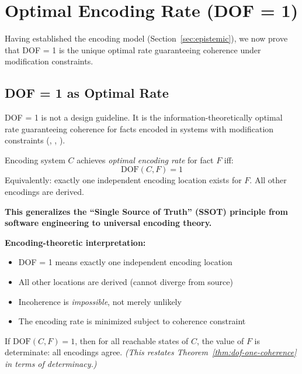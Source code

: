 \section{Optimal Encoding Rate (DOF = 1)}\label{sec:ssot}

Having established the encoding model (Section~\ref{sec:epistemic}), we now prove that DOF = 1 is the unique optimal rate guaranteeing coherence under modification constraints.

\subsection{DOF = 1 as Optimal Rate}\label{sec:ssot-def}

DOF = 1 is not a design guideline. It is the information-theoretically optimal rate guaranteeing coherence for facts encoded in systems with modification constraints (, , ).

\begin{definition}[Optimal Encoding (DOF = 1)]\label{def:ssot}
Encoding system $C$ achieves \emph{optimal encoding rate} for fact $F$ iff:
\[
\text{DOF}(C, F) = 1
\]
Equivalently: exactly one independent encoding location exists for $F$. All other encodings are derived.
\end{definition}

\textbf{This generalizes the ``Single Source of Truth'' (SSOT) principle from software engineering to universal encoding theory.}

\textbf{Encoding-theoretic interpretation:}
\begin{itemize}
\tightlist
\item DOF = 1 means exactly one independent encoding location
\item All other locations are derived (cannot diverge from source)
\item Incoherence is \emph{impossible}, not merely unlikely
\item The encoding rate is minimized subject to coherence constraint
\end{itemize}

\begin{corollary}[DOF = 1 Guarantees Determinacy]\label{thm:ssot-determinate}
If $\text{DOF}(C, F) = 1$, then for all reachable states of $C$, the value of $F$ is determinate: all encodings agree. \emph{(This restates Theorem~\ref{thm:dof-one-coherence} in terms of determinacy.)}
\end{corollary}

